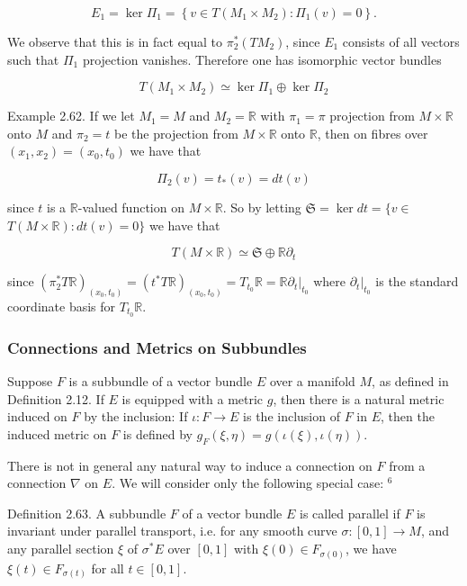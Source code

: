 \documentclass[10pt, letterpaper]{article}
\begin{document}
$$
E_{1}=\operatorname{ker} \Pi_{1}=\left\{v \in T\left(M_{1} \times M_{2}\right): \Pi_{1}(v)=0\right\} .
$$

We observe that this is in fact equal to $\pi_{2}^{*}\left(T M_{2}\right)$, since $E_{1}$ consists of all vectors such that $\Pi_{1}$ projection vanishes. Therefore one has isomorphic vector bundles

$$
T\left(M_{1} \times M_{2}\right) \simeq \operatorname{ker} \Pi_{1} \oplus \operatorname{ker} \Pi_{2}
$$

Example 2.62. If we let $M_{1}=M$ and $M_{2}=\mathbb{R}$ with $\pi_{1}=\pi$ projection from $M \times \mathbb{R}$ onto $M$ and $\pi_{2}=t$ be the projection from $M \times \mathbb{R}$ onto $\mathbb{R}$, then on fibres over $\left(x_{1}, x_{2}\right)=\left(x_{0}, t_{0}\right)$ we have that

$$
\Pi_{2}(v)=t_{*}(v)=d t(v)
$$

since $t$ is a $\mathbb{R}$-valued function on $M \times \mathbb{R}$. So by letting $\mathfrak{S}=\operatorname{ker} d t=\{v \in$ $T(M \times \mathbb{R}): d t(v)=0\}$ we have that

$$
T(M \times \mathbb{R}) \simeq \mathfrak{S} \oplus \mathbb{R} \partial_{t}
$$

since $\left(\pi_{2}^{*} T \mathbb{R}\right)_{\left(x_{0}, t_{0}\right)}=\left(t^{*} T \mathbb{R}\right)_{\left(x_{0}, t_{0}\right)}=T_{t_{0}} \mathbb{R}=\left.\mathbb{R} \partial_{t}\right|_{t_{0}}$ where $\left.\partial_{t}\right|_{t_{0}}$ is the standard coordinate basis for $T_{t_{0}} \mathbb{R}$.

\subsubsection*{Connections and Metrics on Subbundles}
Suppose $F$ is a subbundle of a vector bundle $E$ over a manifold $M$, as defined in Definition 2.12. If $E$ is equipped with a metric $g$, then there is a natural metric induced on $F$ by the inclusion: If $\iota: F \rightarrow E$ is the inclusion of $F$ in $E$, then the induced metric on $F$ is defined by $g_{F}(\xi, \eta)=g(\iota(\xi), \iota(\eta))$.

There is not in general any natural way to induce a connection on $F$ from a connection $\nabla$ on $E$. We will consider only the following special case: ${ }^{6}$

Definition 2.63. A subbundle $F$ of a vector bundle $E$ is called parallel if $F$ is invariant under parallel transport, i.e. for any smooth curve $\sigma:[0,1] \rightarrow M$, and any parallel section $\xi$ of $\sigma^{*} E$ over $[0,1]$ with $\xi(0) \in F_{\sigma(0)}$, we have $\xi(t) \in F_{\sigma(t)}$ for all $t \in[0,1]$.
\end{document}
